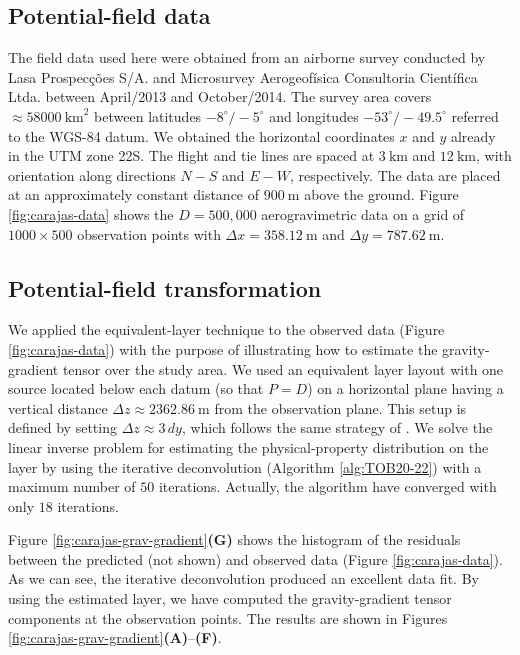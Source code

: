 \documentclass[utf8]{FrontiersinHarvard} %
\begin{document}
	\subsection{Potential-field data}
	
	The field data used here were obtained from an airborne survey conducted by Lasa Prospec{\c c}{\~o}es S/A. 
	and Microsurvey Aerogeof{\'i}sica Consultoria Cient{\'i}fica Ltda. between April/2013 and October/2014.
	The survey area covers $\approx 58000 \: \mathrm{km}^2$ between latitudes $-8^{\circ} \slash -5^{\circ}$
	and longitudes $-53^{\circ} \slash -49.5^{\circ}$ referred to the WGS-84 datum.
	We obtained the horizontal coordinates $x$ and $y$ already in the UTM zone 22S. 
	The flight and tie lines are spaced at $3 \: \mathrm{km}$  and $12 \: \mathrm{km}$, with orientation along 
	directions $N-S$ and $E-W$, respectively.
	The data are placed at an approximately constant distance of $900 \: \mathrm{m}$ above the ground.
	Figure \ref{fig:carajas-data} shows the $D = 500,000$ aerogravimetric data on a grid of 
	$1000 \times 500$ observation points with $\Delta x = 358.12 \: \mathrm{m}$ and $\Delta y = 787.62 \: \mathrm{m}$. 
	
	\subsection{Potential-field transformation}
	
	We applied the equivalent-layer technique to the observed data (Figure \ref{fig:carajas-data}) with the
	purpose of illustrating how to estimate the gravity-gradient tensor over the study area.
	We used an equivalent layer layout with one source located below each datum
	(so that $P=D$) on a horizontal plane having a vertical distance $\Delta z \approx 2362.86 \: \mathrm{m}$ from the observation plane.
	This setup is defined by setting $\Delta z \approx 3 \, dy$, which follows the same strategy of \citet{reis-etal2020}.
	We solve the linear inverse problem for estimating the physical-property distribution on the layer by
	using the iterative deconvolution (Algorithm \ref{alg:TOB20-22}) with a maximum number of $50$ iterations. 
	Actually, the algorithm have converged with only $18$ iterations.
	
	Figure \ref{fig:carajas-grav-gradient}\textbf{(G)} shows the histogram of the residuals between the predicted 
	(not shown) and observed data (Figure \ref{fig:carajas-data}).
	As we can see, the iterative deconvolution produced an excellent data fit.
	By using the estimated layer, we have computed the gravity-gradient tensor components at the observation points.
	The results are shown in Figures \ref{fig:carajas-grav-gradient}\textbf{(A)}--\textbf{(F)}.
	
\end{document}
